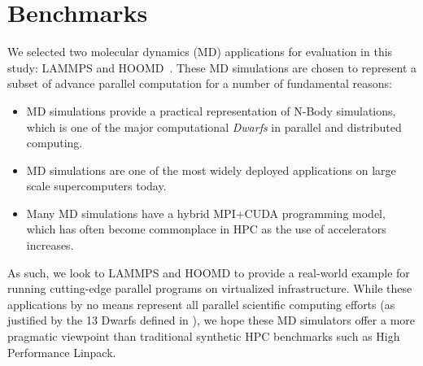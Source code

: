 



\section{Benchmarks}\label{benchmarks}
We selected two molecular dynamics (MD) applications for evaluation in this study:
LAMMPS and HOOMD~\cite{plimpton2007lammps,anderson2010hoomd}.  These MD simulations are chosen to represent a subset of advance parallel computation for a number of fundamental reasons:

\begin{itemize}
\item MD simulations provide a practical representation of N-Body simulations, which is one of the major computational \emph{Dwarfs} \cite{asanovic2006landscape} in parallel and distributed computing. 
\item MD simulations are one of the most widely deployed applications on large scale supercomputers today.
\item Many MD simulations have a hybrid MPI+CUDA programming model, which has often become commonplace in HPC as the use of accelerators increases.
\end{itemize}

As such, we look to LAMMPS and HOOMD to provide a real-world example for running cutting-edge parallel programs on virtualized infrastructure. While these applications by no means represent all parallel scientific computing efforts (as justified by the 13 Dwarfs defined in \cite{asanovic2006landscape}), we hope these MD simulators offer a more pragmatic viewpoint than traditional synthetic HPC benchmarks such as High Performance Linpack. 

